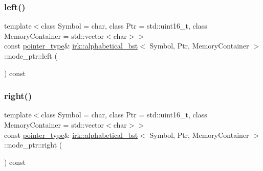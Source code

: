 \subsubsection{\texorpdfstring{left()}{left()}}
{\footnotesize\ttfamily template$<$class Symbol = char, class Ptr = std\+::uint16\+\_\+t, class Memory\+Container = std\+::vector$<$char$>$$>$ \\
const \mbox{\hyperlink{classirk_1_1alphabetical__bst_ae689c05ab96a71769e24908d5c73765c}{pointer\+\_\+type}}\& \mbox{\hyperlink{classirk_1_1alphabetical__bst}{irk\+::alphabetical\+\_\+bst}}$<$ Symbol, Ptr, Memory\+Container $>$\+::node\+\_\+ptr\+::left (\begin{DoxyParamCaption}{ }\end{DoxyParamCaption}) const\hspace{0.3cm}{\ttfamily [inline]}}

\mbox{\label{structirk_1_1alphabetical__bst_1_1node__ptr_a11bac9c1ab6dc6a2b395a02c334bd535}} 
\subsubsection{\texorpdfstring{right()}{right()}}
{\footnotesize\ttfamily template$<$class Symbol = char, class Ptr = std\+::uint16\+\_\+t, class Memory\+Container = std\+::vector$<$char$>$$>$ \\
const \mbox{\hyperlink{classirk_1_1alphabetical__bst_ae689c05ab96a71769e24908d5c73765c}{pointer\+\_\+type}}\& \mbox{\hyperlink{classirk_1_1alphabetical__bst}{irk\+::alphabetical\+\_\+bst}}$<$ Symbol, Ptr, Memory\+Container $>$\+::node\+\_\+ptr\+::right (\begin{DoxyParamCaption}{ }\end{DoxyParamCaption}) const\hspace{0.3cm}{\ttfamily [inline]}}

\mbox{\label{structirk_1_1alphabetical__bst_1_1node__ptr_a8a8eaa5ac49c5c7b19e3dd1d416a023b}} 
